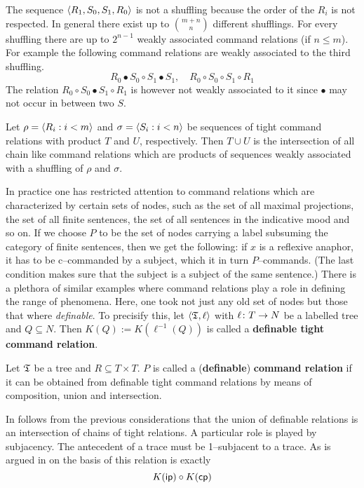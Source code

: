 The sequence $\langle R_1, S_0, S_1, R_0\rangle$ is not a shuffling because
the order of the  $R_i$ is not respected. In general there exist
up to ${m+n \choose n}$ different shufflings. For every shuffling
there are up to $2^{n-1}$ weakly associated command relations
(if $n \leq m$).  For example the following command relations
are weakly associated to the third shuffling.
\begin{equation}
R_0 \bullet S_0 \circ S_1 \bullet S_1, \quad
R_0 \circ S_0 \circ S_1 \circ R_1
\end{equation}
The relation $R_0 \circ S_0 \bullet S_1 \circ R_1$ is however
not weakly associated to it since $\bullet$ may not occur in
between two $S$.
\begin{lem}
\label{lem:spleiss}
Let $\rho = \langle R_i : i < m\rangle$ and $\sigma =
\langle S_i : i < n\rangle$  be sequences of tight command relations
with product $T$ and $U$, respectively. Then $T \cup U$ is the
intersection of all chain like command relations
which are products of sequences weakly associated with
a shuffling of $\rho$ and $\sigma$.
\end{lem}

In practice one has restricted attention to command relations
which are characterized by certain sets of nodes, such as the set
of all maximal projections, the set of all finite sentences, the
set of all sentences in the indicative mood and so on. If we
choose $P$ to be the set of nodes carrying a label subsuming the
category of finite sentences, then we get the following: if $x$ is
a reflexive anaphor, it has to be c--commanded by a subject, which
it in turn $P$--commands. (The last condition makes sure that the
subject is a subject of the same sentence.) There is a plethora of
similar examples where command relations play a role in defining
the range of phenomena. Here, one took not just any old set of
nodes but those that where {\it definable}. To precisify this, let
$\langle \mathfrak{T}, \ell\rangle$ with $\ell \colon T \rightarrow N$ be a labelled tree and
$Q \subseteq N$. Then $K(Q) := K(\ell^{-1}(Q))$ is called a
\textbf{definable tight command relation}.
\begin{defn}
Let $\mathfrak{T}$ be a tree and $R \subseteq T\times T$. $P$ is
called a (\textbf{definable}) \textbf{command relation} if it
can be obtained from definable tight command relations
by means of composition, union and intersection.
\end{defn}
In follows from the previous considerations that the union
of definable relations is an intersection of chains of
tight relations. A particular role is played by subjacency.
The antecedent of a trace must be 1--subjacent to a trace.
As  is argued in \cite{kracht:adjunction} on the basis of
\cite{chomsky:barriers} this relation is exactly
\begin{equation}
K(\mbox{\sf ip}) \circ K(\mbox{\sf cp}) 
\end{equation}

